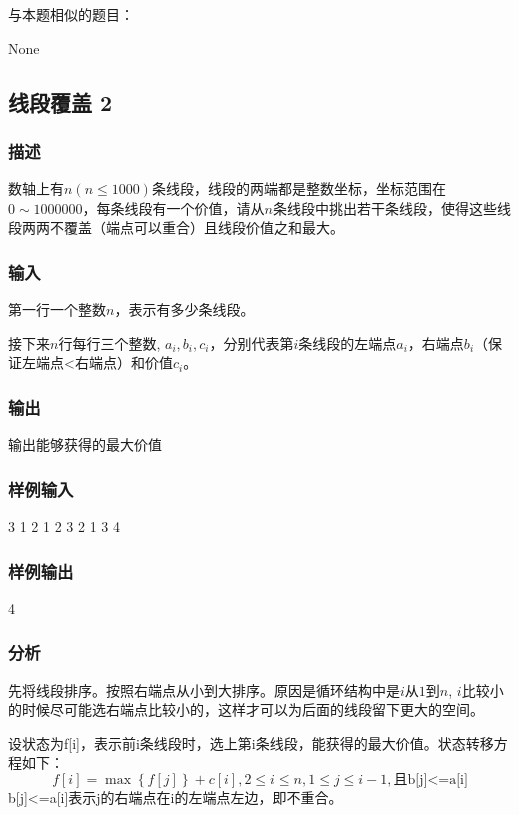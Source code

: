 与本题相似的题目：
\begindot
\item  None
\myenddot


\subsection{线段覆盖 2}

\subsubsection{描述}
数轴上有$n(n \leq 1000)$条线段，线段的两端都是整数坐标，坐标范围在$0 \sim 1000000$，每条线段有一个价值，请从$n$条线段中挑出若干条线段，使得这些线段两两不覆盖（端点可以重合）且线段价值之和最大。

\subsubsection{输入}
第一行一个整数$n$，表示有多少条线段。

接下来$n$行每行三个整数, $a_i,b_i,c_i$，分别代表第$i$条线段的左端点$a_i$，右端点$b_i$（保证左端点<右端点）和价值$c_i$。

\subsubsection{输出}
输出能够获得的最大价值

\subsubsection{样例输入}
\begin{Code}
3
1 2 1
2 3 2
1 3 4
\end{Code}

\subsubsection{样例输出}
\begin{Code}
4
\end{Code}

\subsubsection{分析}
先将线段排序。按照右端点从小到大排序。原因是循环结构中是$i$从$1$到$n$, $i$比较小的时候尽可能选右端点比较小的，这样才可以为后面的线段留下更大的空间。

设状态为f[i]，表示前i条线段时，选上第i条线段，能获得的最大价值。状态转移方程如下：
$$
f[i]=\max\left\{f[j]\right\}+c[i], 2 \leq i \leq n, 1 \leq j \leq i-1,\text{且b[j]<=a[i]}
$$
b[j]<=a[i]表示j的右端点在i的左端点左边，即不重合。

